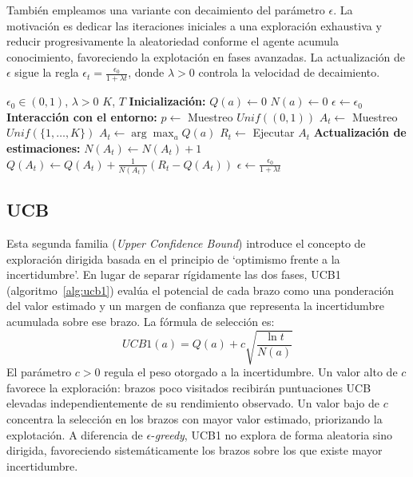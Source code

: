 También empleamos una variante con decaimiento del parámetro $\epsilon$. La motivación es dedicar las iteraciones iniciales a una exploración exhaustiva y reducir progresivamente la aleatoriedad conforme el agente acumula conocimiento, favoreciendo la explotación en fases avanzadas. La actualización de $\epsilon$ sigue la regla $\epsilon_t=\frac{\epsilon_0}{1+\lambda t}$, donde $\lambda>0$ controla la velocidad de decaimiento. 

\begin{algorithm}[H]
\caption{$\epsilon$-\textit{greedy} con decaimiento proporcional}
\label{alg:epsilon_decay}
\begin{algorithmic}[1]
\Require $\epsilon_0 \in (0,1)$, $\lambda>0$ $K$, $T$
\State \textbf{Inicialización:}
    \State $Q(a) \leftarrow 0$ 
    \State $N(a) \leftarrow 0$ 
    \State $\epsilon \leftarrow \epsilon_0$
\EndFor
\State \textbf{Interacción con el entorno:}
    \State $p \leftarrow$ Muestreo $Unif((0,1))$ 
        \State $A_t \leftarrow$ Muestreo $Unif(\{1, \dots, K\})$ 
    \Else
        \State $A_t \leftarrow \arg\max_{a} Q(a)$ 
    \EndIf
    \State $R_t \leftarrow$ Ejecutar $A_t$
    \State \textbf{Actualización de estimaciones:}
    \State $N(A_t) \leftarrow N(A_t) + 1$
    \State $Q(A_t) \leftarrow Q(A_t) + \frac{1}{N(A_t)} \left( R_t - Q(A_t) \right)$
    \State $\epsilon \leftarrow \frac{\epsilon_0}{1+\lambda t}$
\EndFor
\end{algorithmic}
\end{algorithm}

\subsection{UCB}

Esta segunda familia (\textit{Upper Confidence Bound}) introduce el concepto de exploración dirigida basada en el principio de `optimismo frente a la incertidumbre'. En lugar de separar rígidamente las dos fases, UCB1 (algoritmo~\ref{alg:ucb1}) evalúa el potencial de cada brazo como una ponderación del valor estimado y un margen de confianza que representa la incertidumbre acumulada sobre ese brazo. La fórmula de selección es:
$$UCB1(a)=Q(a)+c\sqrt{\frac{\ln t}{N(a)}}$$
El parámetro $c>0$ regula el peso otorgado a la incertidumbre. Un valor alto de $c$ favorece la exploración: brazos poco visitados recibirán puntuaciones UCB elevadas independientemente de su rendimiento observado. Un valor bajo de $c$ concentra la selección en los brazos con mayor valor estimado, priorizando la explotación. A diferencia de $\epsilon$-\textit{greedy}, UCB1 no explora de forma aleatoria sino dirigida, favoreciendo sistemáticamente los brazos sobre los que existe mayor incertidumbre. 

